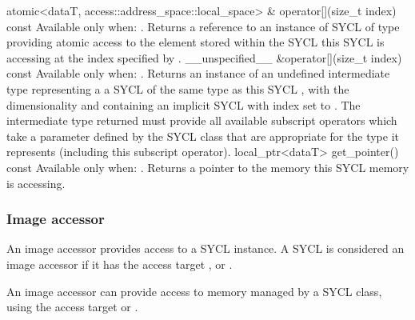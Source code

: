   \addRowTwoL
    { atomic<dataT, access::address_space::local_space> \& }
    { operator[](size_t index) const }
    {
      Available only when: .
      \newline
      Returns a reference to an instance of SYCL  of type
       providing atomic access to the element stored within
      the SYCL  this SYCL  is accessing
      at the index specified by .
    }
  \addRow
    { \__unspecified__ \&operator[](size_t index) const }
    {
      Available only when: .
      \newline
      Returns an instance of an undefined intermediate type representing a
      a SYCL  of the same type as this SYCL , with the dimensionality  and
      containing an implicit SYCL  with index  set to . The intermediate type returned
      must provide all available subscript operators which take a  parameter defined by the SYCL  class that
      are appropriate for the type it represents (including this subscript
      operator).
    }
  \addRow
    { local_ptr<dataT> get_pointer() const}
    {
      Available only when: .
      Returns a pointer to the memory this SYCL  memory is
      accessing.
    }
\completeTable


\subsubsection{Image accessor}
\label{sub.section.accessors.image}

An image accessor provides access to a SYCL  instance. A SYCL  is considered an image accessor if it has the access
target ,  or .
      
An image accessor can provide access to memory managed by a SYCL  class, using the access target  or
.

